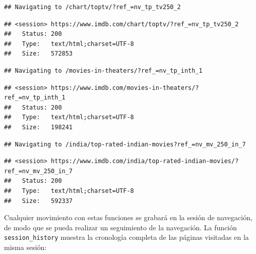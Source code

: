 \documentclass[]{article}
\newenvironment{Shaded}{\begin{snugshade}}{\end{snugshade}}
\newcommand{\KeywordTok}[1]{\textcolor[rgb]{0.13,0.29,0.53}{\textbf{#1}}}
\newcommand{\DataTypeTok}[1]{\textcolor[rgb]{0.13,0.29,0.53}{#1}}
\newcommand{\StringTok}[1]{\textcolor[rgb]{0.31,0.60,0.02}{#1}}
\newcommand{\CommentTok}[1]{\textcolor[rgb]{0.56,0.35,0.01}{\textit{#1}}}
\newcommand{\OperatorTok}[1]{\textcolor[rgb]{0.81,0.36,0.00}{\textbf{#1}}}
\newcommand{\NormalTok}[1]{#1}
\begin{document}
\begin{verbatim}
## Navigating to /chart/toptv/?ref_=nv_tp_tv250_2
\end{verbatim}

\begin{verbatim}
## <session> https://www.imdb.com/chart/toptv/?ref_=nv_tp_tv250_2
##   Status: 200
##   Type:   text/html;charset=UTF-8
##   Size:   572853
\end{verbatim}

\begin{Shaded}
\end{Shaded}

\begin{verbatim}
## Navigating to /movies-in-theaters/?ref_=nv_tp_inth_1
\end{verbatim}

\begin{verbatim}
## <session> https://www.imdb.com/movies-in-theaters/?ref_=nv_tp_inth_1
##   Status: 200
##   Type:   text/html;charset=UTF-8
##   Size:   198241
\end{verbatim}

\begin{Shaded}
\end{Shaded}

\begin{verbatim}
## Navigating to /india/top-rated-indian-movies?ref_=nv_mv_250_in_7
\end{verbatim}

\begin{verbatim}
## <session> https://www.imdb.com/india/top-rated-indian-movies/?ref_=nv_mv_250_in_7
##   Status: 200
##   Type:   text/html;charset=UTF-8
##   Size:   592337
\end{verbatim}

Cualquier movimiento con estas funciones se grabará en la sesión de
navegación, de modo que se pueda realizar un seguimiento de la
navegación. La función \texttt{session\_history} muestra la cronología
completa de las páginas visitadas en la misma sesión:
\end{document}
